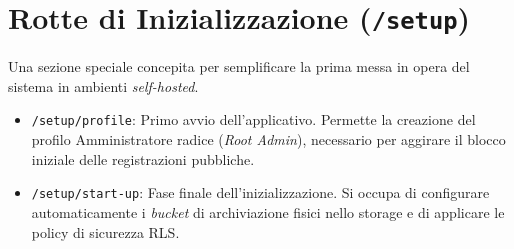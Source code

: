 \documentclass[12pt,a4paper]{report}
\begin{document}
\section{Rotte di Inizializzazione (\texttt{/setup})}
Una sezione speciale concepita per semplificare la prima messa in
opera del sistema in ambienti \textit{self-hosted}.
\begin{itemize}
  \item \texttt{/setup/profile}: Primo avvio dell'applicativo.
    Permette la creazione del profilo Amministratore radice
    (\textit{Root Admin}), necessario per aggirare il blocco iniziale
    delle registrazioni pubbliche.
  \item \texttt{/setup/start-up}: Fase finale dell'inizializzazione.
    Si occupa di configurare automaticamente i \textit{bucket} di
    archiviazione fisici nello storage e di applicare le policy di
    sicurezza RLS.
\end{itemize}



\end{document}
